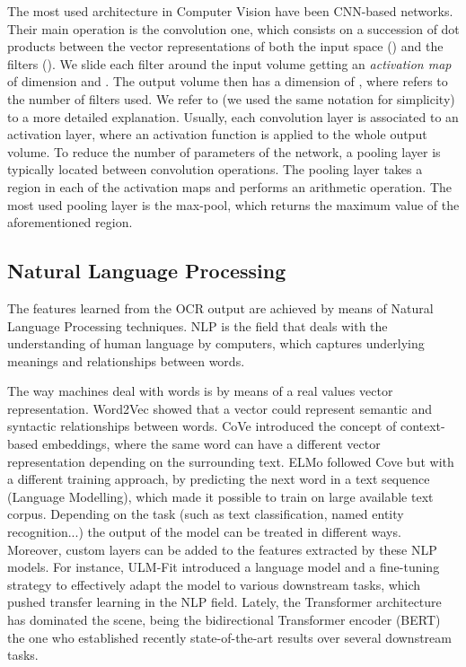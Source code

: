 \documentclass[runningheads]{llncs}
\begin{document}
The most used architecture in Computer Vision have been CNN-based networks. Their main operation is the convolution one, which consists on a succession of dot products between the vector representations of both the input space () and the filters (). We slide each filter around the input volume getting an \textit{activation map} of dimension  and . The output volume then has a dimension of , where  refers to the number of filters used. We refer to \cite{charu} (we used the same notation for simplicity) to a more detailed explanation. Usually, each convolution layer is associated to an activation layer, where an activation function is applied to the whole output volume. To reduce the number of parameters of the network, a pooling layer is typically located between convolution operations. The pooling layer takes a region  in each of the  activation maps and performs an arithmetic operation. The most used pooling layer is the max-pool, which returns the maximum value of the aforementioned region.

\subsection{Natural Language Processing}

The features learned from the OCR output are achieved by means of Natural Language Processing techniques. NLP is the field that deals with the understanding of human language by computers, which captures underlying meanings and relationships between words.

The way machines deal with words is by means of a real values vector representation. Word2Vec \cite{word2vec} showed that a vector could represent semantic and syntactic relationships between words. CoVe \cite{mccann2017learned} introduced the concept of context-based embeddings, where the same word can have a different vector representation depending on the surrounding text. ELMo \cite{Peters:2018} followed Cove but with a different training approach, by predicting the next word in a text sequence (Language Modelling), which made it possible to train on large available text corpus. Depending on the task (such as text classification, named entity recognition...) the output of the model can be treated in different ways. Moreover, custom layers can be added to the features extracted by these NLP models. For instance,  ULM-Fit \cite{ulmfit} introduced a language model and a fine-tuning strategy to effectively adapt the model to various downstream tasks, which pushed transfer learning in the NLP field. Lately, the Transformer architecture \cite{NIPS2017_7181} has dominated the scene, being the bidirectional Transformer encoder (BERT) \cite{BERT} the one who established recently state-of-the-art results over several downstream tasks.
\end{document}
